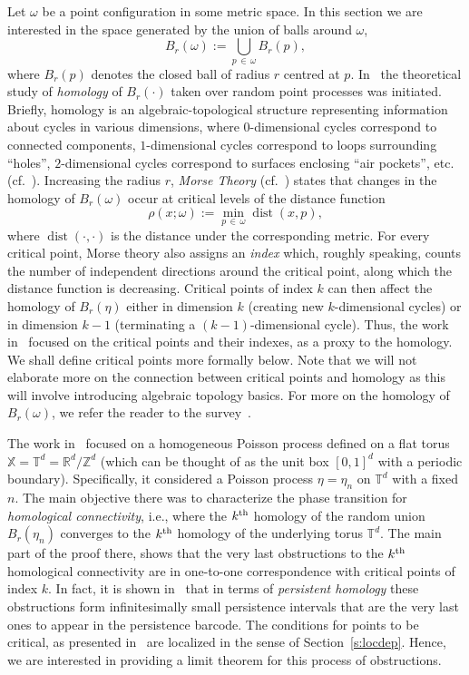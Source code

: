 \documentclass[10pt]{amsart}
\theoremstyle{definition}\newtheorem{defi}[theo]{Definition}\newtheorem{rema}[theo]{Remark}\newtheorem{exam}[theo]{Example}\newtheorem{exem}[theo]{Example}\newtheorem{nota}[theo]{Notation}
\DeclareMathOperator{\dist}{dist}
\newcommand*\R{\mathbb{R}}
\newcommand*\Z{\mathbb{Z}}
\newcommand*\T{\mathbb{T}}
\newcommand*\X{\mathbb{X}}
\begin{document}
Let $\omega$ be a point configuration in some metric space. In this section we are interested in the space generated by the union of balls around $\omega$,
\[
B_r(\omega) := \bigcup_{p\,\in\,\omega} B_r(p),
\]
{where $B_r(p)$ denotes the closed ball of radius $r$ centred at $p$.} In~\cite{kahle_random_2011} the theoretical study of \emph{homology} of $B_r(\cdot)$ taken over random point processes was initiated. Briefly, homology is an algebraic-topological structure representing information about cycles in various dimensions, where $0$-dimensional cycles correspond to connected components, $1$-dimensional cycles correspond to loops surrounding ``holes'', $2$-dimensional cycles correspond to surfaces enclosing ``air pockets'', etc. (cf.~\cite{hatcher_algebraic_2002}). Increasing the radius $r$, \emph{Morse Theory} (cf.~\cite{gershkovich_morse_1997,milnor_morse_1963}) states that changes in the homology of $B_r(\omega)$ occur at critical levels of the distance function
\[
\rho(x;\omega) := \min_{p\,\in\,\omega} \dist(x,p),
\]
where $\dist(\cdot,\cdot)$ is the distance under the corresponding metric. For every critical point, Morse theory also assigns an \emph{index} which, roughly speaking, counts the number of independent directions around the critical point, along which the distance function is decreasing. Critical points of index $k$ can then affect the homology of $B_r(\eta)$ either in dimension $k$ (creating new $k$-dimensional cycles) or in dimension $k-1$ (terminating a $(k-1)$-dimensional cycle). Thus, the work in~\cite{bobrowski_distance_2014,Bobrowski2019} focused on the critical points and their indexes, as a proxy to the homology. We shall define critical points more formally below. Note that we will not elaborate more on the connection between critical points and homology as this will involve introducing algebraic topology basics. For more on the homology of $B_r(\omega)$, we refer the reader to the survey~\cite{Bobrowski2018}.

The work in~\cite{Bobrowski2019} focused on a homogeneous Poisson process defined on a flat torus $\X = \T^d = \R^d/\Z^d$ (which can be thought of as the unit box $[0,1]^d$ with a periodic boundary). Specifically, it considered a Poisson process $\eta=\eta_n$ on $\T^d$ with a fixed $n$. The main objective there was to characterize the phase transition for \emph{homological connectivity}, i.e., where the $k^{\rm th}$ homology of the random union $B_r(\eta_n)$ converges to the $k^{\rm th}$ homology of the underlying torus $\T^d$. The main part of the proof there, shows that the very last obstructions to the $k^{\rm th}$ homological connectivity are in one-to-one correspondence with critical points of index $k$. In fact, it is shown in~\cite[Section~8]{Bobrowski2019} that in terms of \emph{persistent homology} these obstructions form infinitesimally small persistence intervals that are the very last ones to appear in the persistence barcode. The conditions for points to be critical, as presented in~\cite[Section~2.3]{Bobrowski2019} are localized in the sense of Section~\ref{s:locdep}. Hence, we are interested in providing a {limit} theorem for this process of obstructions.
\end{document}
